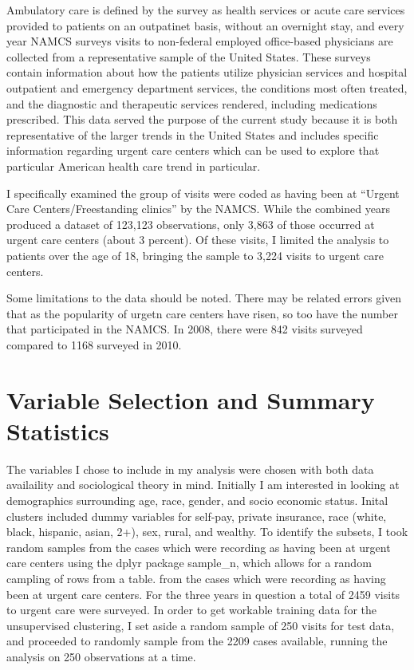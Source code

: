 \documentclass[12pt,twoside]{reedthesis}
\begin{document}
  Ambulatory care is defined by the survey as health services or acute
  care services provided to patients on an outpatinet basis, without an
  overnight stay, and every year NAMCS surveys visits to non-federal
  employed office-based physicians are collected from a representative
  sample of the United States. These surveys contain information about how
  the patients utilize physician services and hospital outpatient and
  emergency department services, the conditions most often treated, and
  the diagnostic and therapeutic services rendered, including medications
  prescribed. This data served the purpose of the current study because it
  is both representative of the larger trends in the United States and
  includes specific information regarding urgent care centers which can be
  used to explore that particular American health care trend in
  particular.
  
  I specifically examined the group of visits were coded as having been at
  ``Urgent Care Centers/Freestanding clinics'' by the NAMCS. While the
  combined years produced a dataset of 123,123 observations, only 3,863 of
  those occurred at urgent care centers (about 3 percent). Of these
  visits, I limited the analysis to patients over the age of 18, bringing
  the sample to 3,224 visits to urgent care centers.
  
  Some limitations to the data should be noted. There may be related
  errors given that as the popularity of urgetn care centers have risen,
  so too have the number that participated in the NAMCS. In 2008, there
  were 842 visits surveyed compared to 1168 surveyed in 2010.
  
  \section{Variable Selection and Summary
  Statistics}\label{variable-selection-and-summary-statistics}
  
  The variables I chose to include in my analysis were chosen with both
  data availaility and sociological theory in mind. Initially I am
  interested in looking at demographics surrounding age, race, gender, and
  socio economic status. Inital clusters included dummy variables for
  self-pay, private insurance, race (white, black, hispanic, asian, 2+),
  sex, rural, and wealthy. To identify the subsets, I took random samples
  from the cases which were recording as having been at urgent care
  centers using the dplyr package sample\_n, which allows for a random
  campling of rows from a table. from the cases which were recording as
  having been at urgent care centers. For the three years in question a
  total of 2459 visits to urgent care were surveyed. In order to get
  workable training data for the unsupervised clustering, I set aside a
  random sample of 250 visits for test data, and proceeded to randomly
  sample from the 2209 cases available, running the analysis on 250
  observations at a time.
  
\end{document}
